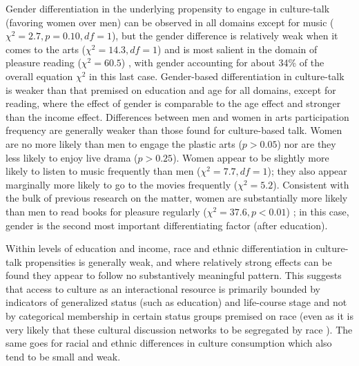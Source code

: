 \documentclass[11pt]{article}
\begin{document}
Gender differentiation in the underlying propensity to engage in culture-talk (favoring women over men) can be observed in all domains except for music ($\chi^{2}=2.7, p=0.10, df=1$), but the gender difference is relatively weak when it comes to the arts ($\chi^{2}=14.3, df = 1$) and is most salient in the domain of pleasure reading ($\chi^{2}=60.5$) \citep{long03, tepper00}, with gender accounting for about 34\% of the overall equation $\chi^{2}$ in this last case.   Gender-based differentiation in culture-talk is weaker than that premised on education and age for all domains, except for reading, where the effect of gender is comparable to the age effect and stronger than the income effect.  Differences between men and women in arts participation frequency are generally weaker than those found for culture-based talk.  Women are no more likely than men to engage the plastic arts ($p>0.05$) nor are they less likely to enjoy live drama ($p>0.25$). Women appear to be slightly more likely to listen to music frequently than men ($\chi^{2}=7.7, df=1$); they also appear marginally more likely to go to the movies frequently ($\chi^{2}=5.2$).  Consistent with the bulk of previous research on the matter, women are substantially more likely than men to read books for pleasure regularly ($\chi^{2}=37.6, p<0.01$) \citep{tepper00}; in this case, gender is the second most important differentiating factor (after education).

Within levels of education and income, race and ethnic differentiation in culture-talk propensities is generally weak, and where relatively strong effects can be found they appear to follow no substantively meaningful pattern. This suggests that access to culture as an interactional resource is primarily bounded by indicators of generalized status (such as education) and life-course stage and not by categorical membership in certain status groups premised on race (even as it is very likely  that these cultural discussion networks to be segregated by race \citep{carter03, dimaggio_ostrower90}).  The same goes for racial and ethnic differences in culture consumption which also tend to be small and weak.  
\end{document}

